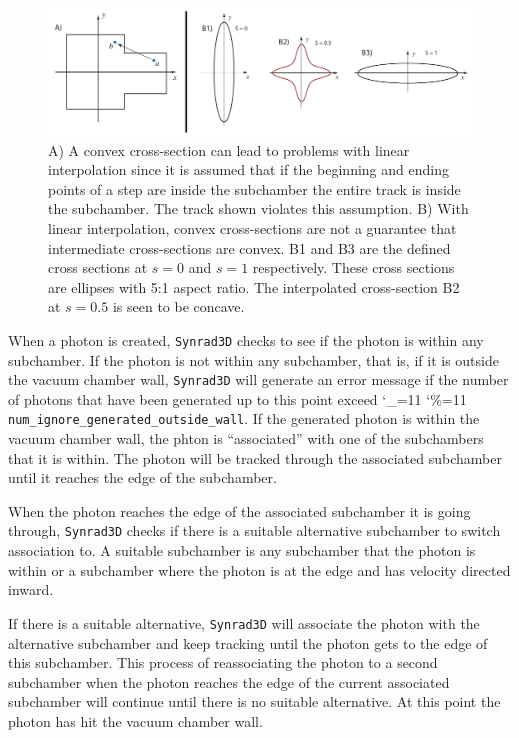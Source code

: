 \documentclass[11pt,openany]{report}
\newcommand{\srthree}{\texttt{Synrad3D}\xspace}
\newcommand\ttcmd{\begingroup\catcode`\_=11 \catcode`\%=11 \dottcmd}
\newcommand\dottcmd[1]{\texttt{#1}\endgroup}
\newcommand{\vn}{\ttcmd}
\begin{document}
\begin{figure}[tb]
\begin{center}
\includegraphics[width=6in]{chamber-problem.pdf} \caption{A) A convex cross-section can
lead to problems with linear interpolation since it is assumed that if the beginning and
ending points of a step are inside the subchamber the entire track is inside the
subchamber. The track shown violates this assumption.  B) With linear interpolation,
convex cross-sections are not a guarantee that intermediate cross-sections are convex. B1
and B3 are the defined cross sections at $s = 0$ and $s = 1$ respectively. These cross
sections are ellipses with 5:1 aspect ratio. The interpolated cross-section B2 at $s =
0.5$ is seen to be concave.}  \label{f:convex-chamber}
\end{center}
\end{figure}

When a photon is created, \srthree checks to see if the photon is within any
subchamber. If the photon is not within any subchamber, that is, if it is outside the
vacuum chamber wall, \srthree will generate an error message if the number of photons that
have been generated up to this point exceed \vn{num_ignore_generated_outside_wall}. If
the generated photon is within the vacuum chamber wall, the phton is ``associated'' with
one of the subchambers that it is within.  The photon will be tracked through the
associated subchamber until it reaches the edge of the subchamber.

When the photon reaches the edge of the associated subchamber it is going through,
\srthree checks if there is a suitable alternative subchamber to switch association to. A
suitable subchamber is any subchamber that the photon is within or a subchamber where the
photon is at the edge and has velocity directed inward.

If there is a suitable alternative, \srthree will associate the photon with the
alternative subchamber and keep tracking until the photon gets to the edge of this
subchamber.  This process of reassociating the photon to a second subchamber when the
photon reaches the edge of the current associated subchamber will continue until there is
no suitable alternative. At this point the photon has hit the vacuum chamber wall.
\end{document}
